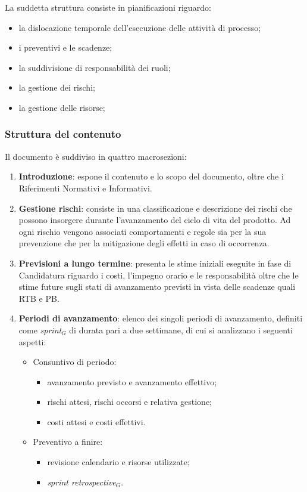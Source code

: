 \documentclass[10pt, letterpaper]{article}
\begin{document}
La suddetta struttura consiste in pianificazioni riguardo:
\begin{itemize}
    \item la dislocazione temporale dell'esecuzione delle attività di processo;
    \item i preventivi e le scadenze;
    \item la suddivisione di responsabilità dei ruoli;
    \item la gestione dei rischi;
    \item la gestione delle risorse;
\end{itemize}

\subsubsection{Struttura del contenuto}
Il documento è suddiviso in quattro macrosezioni:
\begin{enumerate}
    \item \textbf{Introduzione}: espone il contenuto e lo scopo del documento, oltre che i Riferimenti Normativi e Informativi.
    \item \textbf{Gestione rischi}: consiste in una classificazione e descrizione dei rischi che possono insorgere durante l'avanzamento del ciclo
          di vita del prodotto. Ad ogni rischio vengono associati comportamenti e regole sia per la sua prevenzione che per la mitigazione degli effetti in caso di occorrenza.
    \item \textbf{Previsioni a lungo termine}: presenta le stime iniziali eseguite in fase di Candidatura riguardo i costi, l'impegno orario e le responsabilità oltre che le stime future sugli
          stati di avanzamento previsti in vista delle scadenze quali RTB e PB.
    \item \textbf{Periodi di avanzamento}: elenco dei singoli periodi di avanzamento, definiti come \texorpdfstring{\textit{sprint$_G$}}{sprint} di durata pari a due settimane, di cui si analizzano i seguenti aspetti:
          \begin{itemize}
              \item Consuntivo di periodo:
                    \begin{itemize}
                        \item avanzamento previsto e avanzamento effettivo;
                        \item rischi attesi, rischi occorsi e relativa gestione;
                        \item costi attesi e costi effettivi.
                    \end{itemize}
              \item Preventivo a finire:
                    \begin{itemize}
                        \item revisione calendario e risorse utilizzate;
                        \item \texorpdfstring{\textit{sprint retrospective$_G$}}{sprint retrospective}.
                    \end{itemize}

          \end{itemize}
\end{enumerate}
\end{document}
